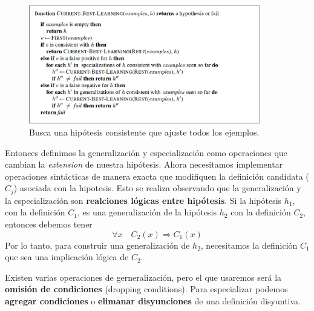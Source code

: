 \documentclass[12 pt, a4paper]{article}
\begin{document}
				\begin{figure}[h]
					\centering
					\includegraphics[width=0.9\textwidth]{BMHA_algorithm.png}
					\caption{Busca una hipótesis consistente que ajuste todos los ejemplos.}%
				\end{figure}
			Entonces definimos la generalización y especialización como operaciones que cambian la \emph{extension} de nuestra hipótesis. Ahora necesitamos implementar operaciones sintácticas de manera exacta que modifiquen la definición candidata (\(C_{j}\)) asociada con la hipotesis. Esto se realiza observando que la generalización y la especialización son \textbf{realciones lógicas entre hipótesis}. Si la hipótesis $h_{1}$, con la definición $C_{1}$, es una generalización de la hipótesis $h_{2}$ con la definición $C_{2}$, entonces debemos tener
				$$\forall x\quad C_{2}(x) \Rightarrow C_{1}(x)$$
			Por lo tanto, para construir una generalización de $h_{2}$, necesitamos la definición $C_{1}$ que sea una implicación lógica de $C_{2}$. 
			
			Existen varias operaciones de gerneralización, pero el que usaremos será la \textbf{omisión de condiciones} (dropping conditions). Para especializar podemos \textbf{agregar condiciones} o \textbf{elimanar disyunciones} de una definición disyuntiva.
			
\end{document}
